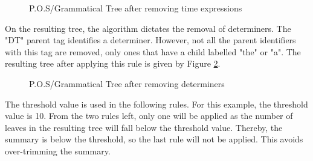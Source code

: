 \begin{figure}[h]
\caption{P.O.S/Grammatical Tree after removing time expressions}
\label{tree:removeTime}
\end{figure}
\par On the resulting tree, the algorithm dictates the removal of determiners. The "DT" parent tag identifies a determiner. However, not all the parent identifiers with this tag are removed, only ones that have a child labelled "the" or "a". The resulting tree after applying this rule is given by Figure \ref{tree:removeDeterminers}.
\begin{figure}[h]
\caption{P.O.S/Grammatical Tree after removing determiners}
\label{tree:removeDeterminers}
\end{figure}
\par The threshold value is used in the following rules. For this example, the threshold value is 10. From the two rules left, only one will be applied as the number of leaves in the resulting tree will fall below the threshold value. Thereby, the summary is below the threshold, so the last rule will not be applied. This avoids over-trimming the summary.
